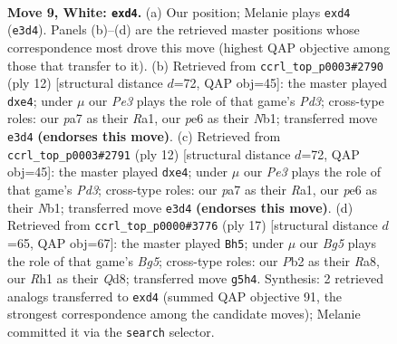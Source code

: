 \documentclass[11pt]{article}
\begin{document}
\clearpage

\begin{figure}[p]\centering
\begin{subfigure}{0.46\textwidth}\centering
\resizebox{\linewidth}{!}{%
\newchessgame
\chessboard[
  setfen={rnbqr1k1/pp3ppp/3bpn2/3p2B1/3p4/3BPN2/PPP2PPP/RN1QK2R w KQ - 0 9},
  showmover=false,
  pgfstyle=straightmove, color=movearrow, markmove={e3-d4}
]}
\caption{}
\end{subfigure}\hfill
\begin{subfigure}{0.46\textwidth}\centering
\resizebox{\linewidth}{!}{%
\newchessgame
\chessboard[
  setfen={r1bqkbnr/1pp3pp/p1np4/4p3/B3p3/2PP1N2/PP3PPP/RNBQK2R w KQkq - 0 7},
  showmover=false,
  pgfstyle=straightmove, color=movearrow, markmove={d3-e4}
]}
\caption{}
\end{subfigure}
\\[4pt]
\begin{subfigure}{0.46\textwidth}\centering
\resizebox{\linewidth}{!}{%
\newchessgame
\chessboard[
  setfen={r1bqkbnr/1pp3pp/p1np4/4p3/B3p3/2PP1N2/PP3PPP/RNBQK2R w KQkq - 0 7},
  showmover=false,
  pgfstyle=straightmove, color=movearrow, markmove={d3-e4}
]}
\caption{}
\end{subfigure}\hfill
\begin{subfigure}{0.46\textwidth}\centering
\resizebox{\linewidth}{!}{%
\newchessgame
\chessboard[
  setfen={r2qk2r/1pp2ppp/p1nbpn2/8/2BP2b1/P1N1PN1P/1P3PP1/R1BQ1RK1 b kq - 0 9},
  showmover=false,
  pgfstyle=straightmove, color=movearrow, markmove={g4-h5}
]}
\caption{}
\end{subfigure}
\caption{\textbf{Move 9, White: \texttt{exd4}.} (a) Our position; Melanie plays \texttt{exd4} (\texttt{e3d4}). Panels (b)--(d) are the retrieved master positions whose correspondence most drove this move (highest QAP objective among those that transfer to it). (b) Retrieved from \texttt{ccrl\_top\_p0003\#2790} (ply 12) [structural distance $d$=72, QAP obj=45]: the master played \texttt{dxe4}; under $\mu$ our \emph{Pe3} plays the role of that game's \emph{Pd3}; cross-type roles: our \emph{p}a7 as their \emph{R}a1, our \emph{p}e6 as their \emph{N}b1; transferred move \texttt{e3d4} \textbf{(endorses this move)}. (c) Retrieved from \texttt{ccrl\_top\_p0003\#2791} (ply 12) [structural distance $d$=72, QAP obj=45]: the master played \texttt{dxe4}; under $\mu$ our \emph{Pe3} plays the role of that game's \emph{Pd3}; cross-type roles: our \emph{p}a7 as their \emph{R}a1, our \emph{p}e6 as their \emph{N}b1; transferred move \texttt{e3d4} \textbf{(endorses this move)}. (d) Retrieved from \texttt{ccrl\_top\_p0000\#3776} (ply 17) [structural distance $d$=65, QAP obj=67]: the master played \texttt{Bh5}; under $\mu$ our \emph{Bg5} plays the role of that game's \emph{Bg5}; cross-type roles: our \emph{P}b2 as their \emph{R}a8, our \emph{R}h1 as their \emph{Q}d8; transferred move \texttt{g5h4}. Synthesis: 2 retrieved analogs transferred to \texttt{exd4} (summed QAP objective 91, the strongest correspondence among the candidate moves); Melanie committed it via the \texttt{search} selector.}
\label{fig:thought-m16}
\end{figure}
\end{document}
